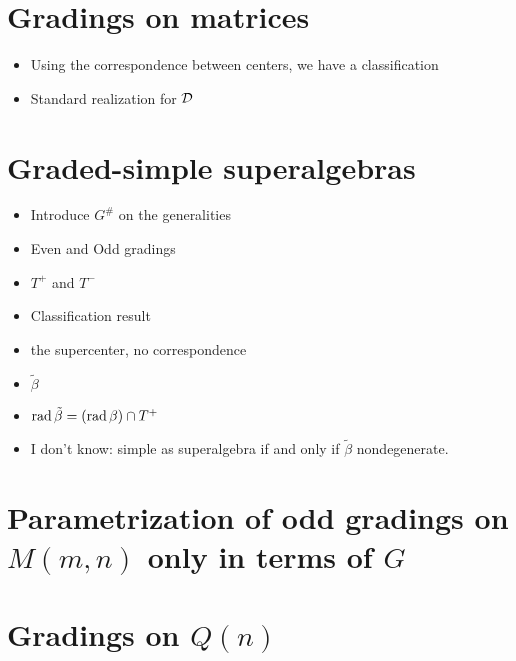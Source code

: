 \section{Gradings on matrices}

\begin{itemize}
    \item Using the correspondence between centers, we have a classification
    \item Standard realization for $\mathcal{D}$
\end{itemize}

\section{Graded-simple superalgebras}

\begin{itemize}
    \item Introduce $G^\#$ on the generalities
    \item Even and Odd gradings
    \item $T^+$ and $T^-$
    \item Classification result
    \item the supercenter, no correspondence
    \item $\tilde\beta$
    \item $\operatorname{rad} \tilde\beta = (\operatorname{rad} \beta)\cap T^+$
    \item I don't know: simple as superalgebra if and only if $\tilde \beta$ nondegenerate.
\end{itemize}

\section{Parametrization of odd gradings on $M(m,n)$ only in terms of $G$}

\section{Gradings on $Q(n)$}

